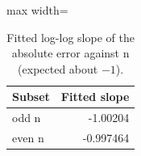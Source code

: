 \begin{table}
\centering
\small
\caption{Fitted log-log slope of the absolute error against n (expected about $-1$).}
\label{tab:e2_slope}
\begin{adjustbox}{max width=\textwidth}
\begin{tabular}{lr}
\toprule
Subset & Fitted slope \\
\midrule
odd n & -1.00204 \\
even n & -0.997464 \\
\bottomrule
\end{tabular}
\end{adjustbox}
\end{table}
